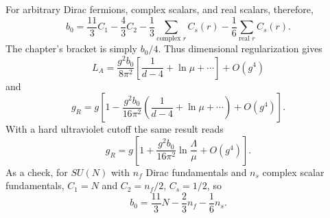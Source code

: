 \begin{enumerate}
  For arbitrary Dirac fermions, complex scalars, and real scalars,
  therefore,
  \[
    b_0=\frac{11}{3}C_1-\frac{4}{3}C_2
       -\frac13\sum_{\text{complex }r}C_s(r)
       -\frac16\sum_{\text{real }r}C_s(r).
  \]
  The chapter's bracket is simply \(b_0/4\).  Thus dimensional
  regularization gives
  \[
    L_A=\frac{g^2b_0}{8\pi^2}
      \left[\frac1{d-4}+\ln\mu+\cdots\right]+O(g^4)
  \]
  and
  \[
    \boxed{
    g_R=g\left[1-\frac{g^2b_0}{16\pi^2}
      \left(\frac1{d-4}+\ln\mu+\cdots\right)+O(g^4)\right].}
  \]
  With a hard ultraviolet cutoff the same result reads
  \[
    g_R=g\left[1+\frac{g^2b_0}{16\pi^2}
      \ln\frac{\Lambda}{\mu}+O(g^4)\right].
  \]
  As a check, for \(SU(N)\) with \(n_f\) Dirac fundamentals and \(n_s\)
  complex scalar fundamentals, \(C_1=N\) and
  \(C_2=n_f/2\), \(C_s=1/2\), so
  \[
    b_0=\frac{11}{3}N-\frac23n_f-\frac16n_s .
  \]
\end{enumerate}
